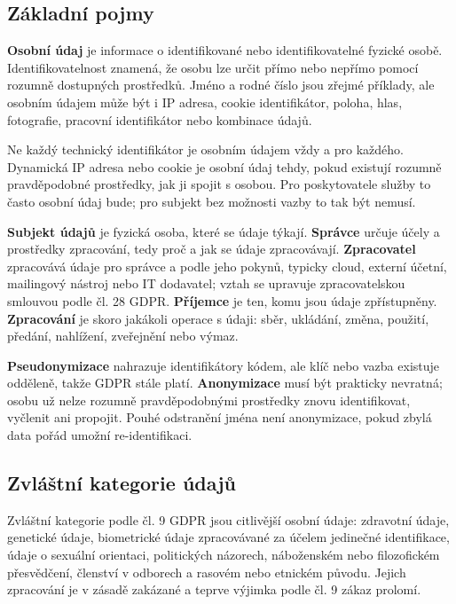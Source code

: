 
\subsection*{Základní pojmy}
\textbf{Osobní údaj} je informace o identifikované nebo identifikovatelné fyzické osobě. Identifikovatelnost znamená, že osobu lze určit přímo nebo nepřímo pomocí rozumně dostupných prostředků. Jméno a rodné číslo jsou zřejmé příklady, ale osobním údajem může být i IP adresa, cookie identifikátor, poloha, hlas, fotografie, pracovní identifikátor nebo kombinace údajů.

Ne každý technický identifikátor je osobním údajem vždy a pro každého. Dynamická IP adresa nebo cookie je osobní údaj tehdy, pokud existují rozumně pravděpodobné prostředky, jak ji spojit s osobou. Pro poskytovatele služby to často osobní údaj bude; pro subjekt bez možnosti vazby to tak být nemusí.

\textbf{Subjekt údajů} je fyzická osoba, které se údaje týkají. \textbf{Správce} určuje účely a prostředky zpracování, tedy proč a jak se údaje zpracovávají. \textbf{Zpracovatel} zpracovává údaje pro správce a podle jeho pokynů, typicky cloud, externí účetní, mailingový nástroj nebo IT dodavatel; vztah se upravuje zpracovatelskou smlouvou podle čl. 28 GDPR. \textbf{Příjemce} je ten, komu jsou údaje zpřístupněny. \textbf{Zpracování} je skoro jakákoli operace s údaji: sběr, ukládání, změna, použití, předání, nahlížení, zveřejnění nebo výmaz.

\textbf{Pseudonymizace} nahrazuje identifikátory kódem, ale klíč nebo vazba existuje odděleně, takže GDPR stále platí. \textbf{Anonymizace} musí být prakticky nevratná; osobu už nelze rozumně pravděpodobnými prostředky znovu identifikovat, vyčlenit ani propojit. Pouhé odstranění jména není anonymizace, pokud zbylá data pořád umožní re-identifikaci.


\subsection*{Zvláštní kategorie údajů}
Zvláštní kategorie podle čl. 9 GDPR jsou citlivější osobní údaje: zdravotní údaje, genetické údaje, biometrické údaje zpracovávané za účelem jedinečné identifikace, údaje o sexuální orientaci, politických názorech, náboženském nebo filozofickém přesvědčení, členství v odborech a rasovém nebo etnickém původu. Jejich zpracování je v zásadě zakázané a teprve výjimka podle čl. 9 zákaz prolomí.

